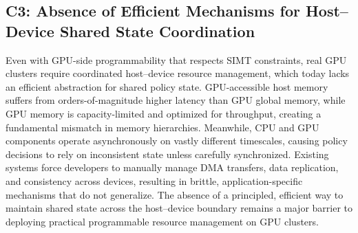 \subsection{C3: Absence of Efficient Mechanisms for Host–Device Shared State Coordination}

Even with GPU-side programmability that respects SIMT constraints, real GPU clusters require coordinated host–device resource management, which today lacks an efficient abstraction for shared policy state. 
GPU-accessible host memory suffers from orders-of-magnitude higher latency than GPU global memory, while GPU memory is capacity-limited and optimized for throughput, creating a fundamental mismatch in memory hierarchies. 
Meanwhile, CPU and GPU components operate asynchronously on vastly different timescales, causing policy decisions to rely on inconsistent state unless carefully synchronized. 
Existing systems force developers to manually manage DMA transfers, data replication, and consistency across devices, resulting in brittle, application-specific mechanisms that do not generalize.
The absence of a principled, efficient way to maintain shared state across the host–device boundary remains a major barrier to deploying practical programmable resource management on GPU clusters.



